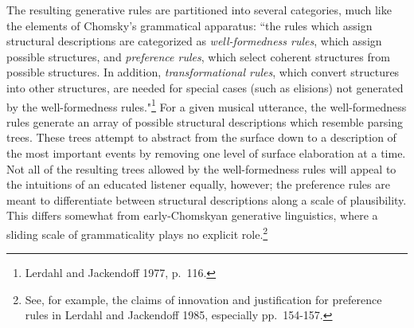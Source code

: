 The resulting generative rules are partitioned into several categories, much like the elements of Chomsky's grammatical apparatus:  ``the rules which assign structural descriptions are categorized as \emph{well-formedness rules}, which assign possible structures, and \emph{preference rules}, which select coherent structures from possible structures.  In addition, \emph{transformational rules}, which convert structures into other structures, are needed for special cases (such as elisions) not generated by the well-formedness rules."\footnote{Lerdahl and Jackendoff 1977, p.\ 116.}  For a given musical utterance, the well-formedness rules generate an array of possible structural descriptions which resemble parsing trees.  These trees attempt to abstract from the surface down to a description of the most important events by removing one level of surface elaboration at a time.  Not all of the resulting trees allowed by the well-formedness rules will appeal to the intuitions of an educated listener equally, however; the preference rules are meant to differentiate between structural descriptions along a scale of plausibility.  This differs somewhat from early-Chomskyan generative linguistics, where a sliding scale of grammaticality plays no explicit role.\footnote{See, for example, the claims of innovation and justification for preference rules in Lerdahl and Jackendoff 1985, especially pp.\ 154-157.}


